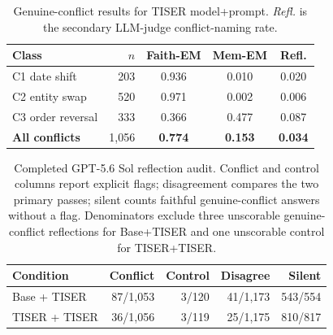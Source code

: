 \documentclass[conference]{IEEEtran}
\begin{document}
\begin{table}[t]
\centering
\caption{Genuine-conflict results for TISER model+prompt. \emph{Refl.} is the secondary LLM-judge conflict-naming rate.}
\label{tab:perclass}
\setlength{\tabcolsep}{5.0pt}
{\footnotesize
\begin{tabular}{lrccc}
\toprule
\textbf{Class} & \textbf{$n$} & \textbf{Faith-EM} & \textbf{Mem-EM} & \textbf{Refl.} \\
\midrule
C1 date shift      & 203 & 0.936 & 0.010 & 0.020 \\
C2 entity swap     & 520 & 0.971 & 0.002 & 0.006 \\
\rowcolor{gray!18}
C3 order reversal  & 333 & 0.366 & 0.477 & 0.087 \\
\midrule
\textbf{All conflicts} & 1{,}056 & \textbf{0.774} & \textbf{0.153} & \textbf{0.034} \\
\bottomrule
\end{tabular}
}
\end{table}

\begin{table}[t]
\centering
\caption{Completed GPT-5.6 Sol reflection audit. Conflict and control columns report explicit flags; disagreement compares the two primary passes; silent counts faithful genuine-conflict answers without a flag. Denominators exclude three unscorable genuine-conflict reflections for Base+TISER and one unscorable control for TISER+TISER.}
\label{tab:reflection-audit}
\setlength{\tabcolsep}{2.4pt}
{\footnotesize
\begin{tabular}{lrrrr}
\toprule
\textbf{Condition} & \textbf{Conflict} & \textbf{Control} & \textbf{Disagree} & \textbf{Silent} \\
\midrule
Base + TISER & 87/1{,}053 & 3/120 & 41/1{,}173 & 543/554 \\
\rowcolor{gray!18}
TISER + TISER & 36/1{,}056 & 3/119 & 25/1{,}175 & 810/817 \\
\bottomrule
\end{tabular}
}
\end{table}
\end{document}
